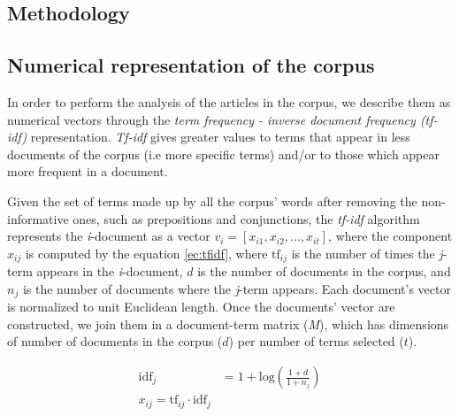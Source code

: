 \documentclass{bmcart}
\begin{document}
\begin{backmatter}
%
%
\section*{Methodology} 

\label{sec:Methodology}

\subsection*{Numerical representation of the corpus}

\par In order to perform the analysis of the articles in the corpus, we describe them as numerical vectors through the \textit{term frequency - inverse document frequency (tf-idf)} representation. \textit{Tf-idf} gives greater values to terms that appear in less documents of the corpus (i.e more specific terms) and/or to those which appear more frequent in a document.

\par Given the set of terms made up by all the corpus' words after removing the non-informative ones, such as prepositions and conjunctions, the \textit{tf-idf} algorithm represents the \textit{i}-document as a vector $v_i = [x_{i1}, x_{i2}, ... , x_{it}]$, where the component $x_{ij}$ is computed by the equation \ref{ec:tfidf}, where $\textrm{tf}_{ij}$ is the number of times the \textit{j}-term appears in the \textit{i}-document, $d$ is the number of documents in the corpus, and $n_j$ is the number of documents where the \textit{j}-term appears. Each document's vector is normalized to unit Euclidean length.
Once the documents' vector are constructed, we join them in a document-term matrix (\emph{M}), which has dimensions of number of documents in the corpus ($d$) per number of terms selected ($t$).

\begin{center}
\begin{equation}
\begin{split}
\text{idf}_{j} & = 1 + \textrm{log}(\frac{1 + d}{1 + n_j}) \\
x_{ij} = \textrm{tf}_{ij} \cdot \textrm{idf}_{j}
\end{split}
\label{ec:tfidf}
\end{equation}
\end{center}


\end{backmatter}
\end{document}
